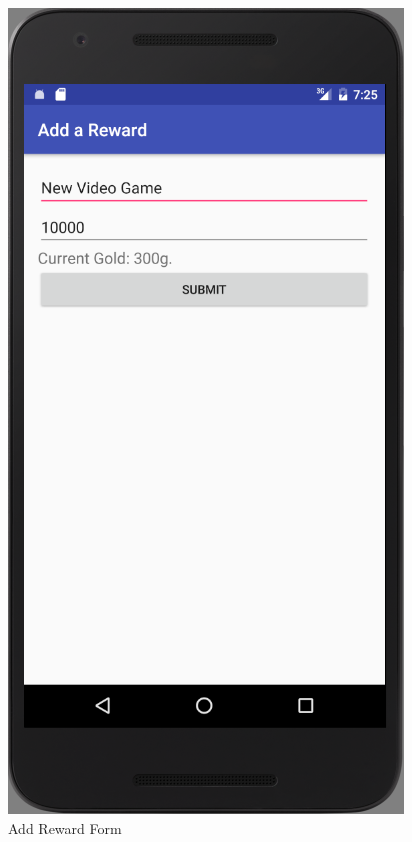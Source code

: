 \begin{figure}[ht]
\begin{minipage}[b]{0.45\linewidth}
    \includegraphics[width=.7\linewidth, frame]{../images/Screenshot/AddRewardScreen.png}
    \caption{Add Reward Form} 
    \vspace{4ex}
  \end{minipage}%
  \begin{minipage}[b]{0.45\linewidth}
    \centering

\end{minipage}
\end{figure}
